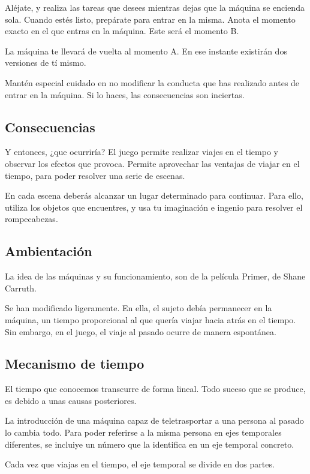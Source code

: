 \documentclass[11pt,a4paper]{article}
\begin{document}
Aléjate, y realiza las tareas que desees mientras dejas que la máquina se 
encienda sola. Cuando estés listo, prepárate para entrar en la misma. Anota el 
momento exacto en el que entras en la máquina. Este será el momento B.

La máquina te llevará de vuelta al momento A. En ese instante existirán dos 
versiones de tí mismo.

Mantén especial cuidado en no modificar la conducta que has realizado antes de 
entrar en la máquina. Si lo haces, las consecuencias son inciertas. 

\subsection{Consecuencias}

Y entonces, ¿que ocurriría? El juego permite realizar viajes en el tiempo y 
observar los efectos que provoca. Permite aprovechar las ventajas de viajar en 
el tiempo, para poder resolver una serie de escenas.

En cada escena deberás alcanzar un lugar determinado para continuar. Para ello, 
utiliza los objetos que encuentres, y usa tu imaginación e ingenio para resolver 
el rompecabezas.

\subsection{Ambientación}
La idea de las máquinas y su funcionamiento, son de la película Primer, de Shane 
Carruth.

Se han modificado ligeramente. En ella, el sujeto debía permanecer en la 
máquina, un tiempo proporcional al que quería viajar hacia atrás en el tiempo.  
Sin embargo, en el juego, el viaje al pasado ocurre de manera espontánea.


\subsection{Mecanismo de tiempo}
El tiempo que conocemos transcurre de forma lineal. Todo suceso que se produce, 
es debido a unas causas posteriores.

La introducción de una máquina capaz de teletrasportar a una persona al pasado 
lo cambia todo. Para poder referirse a la misma persona en ejes temporales 
diferentes, se incluiye un número que la identifica en un eje temporal concreto.

Cada vez que viajas en el tiempo, el eje temporal se divide en dos partes.
\end{document}
